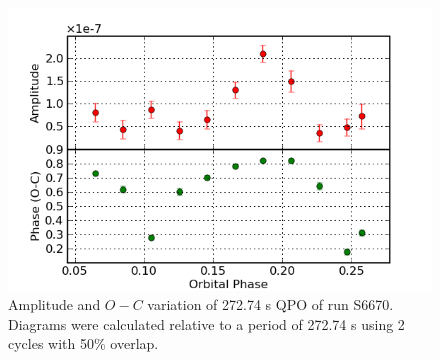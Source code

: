 
\begin{figure}
 \centering
 \includegraphics[bb=0 0 600 400,width=0.85\columnwidth]{images/archive_phot/S6670/S6670d_272.74.png}
 \caption[S6670 $O-C$ diagram of 272.74 s QPO]{Amplitude and $O-C$ variation of 272.74 s QPO of run S6670. Diagrams were calculated relative to a period of 272.74 s using 2 cycles with 50\% overlap. }
 \label{S6670_272.74}
\end{figure}

\pagebreak











